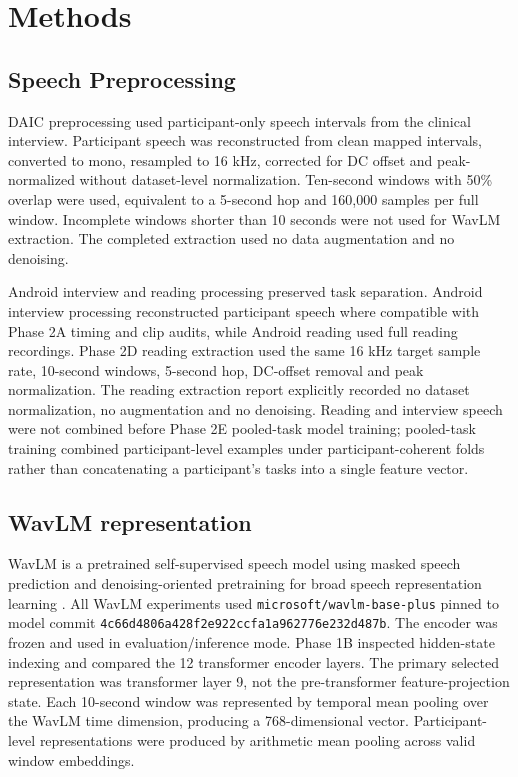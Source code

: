 \documentclass[lettersize,journal]{IEEEtran}
\begin{document}
\section{Methods}

\subsection{Speech Preprocessing}

DAIC preprocessing used participant-only speech intervals from the clinical interview. Participant speech was reconstructed from clean mapped intervals, converted to mono, resampled to 16 kHz, corrected for DC offset and peak-normalized without dataset-level normalization. Ten-second windows with 50\% overlap were used, equivalent to a 5-second hop and 160,000 samples per full window. Incomplete windows shorter than 10 seconds were not used for WavLM extraction. The completed extraction used no data augmentation and no denoising.

Android interview and reading processing preserved task separation. Android interview processing reconstructed participant speech where compatible with Phase 2A timing and clip audits, while Android reading used full reading recordings. Phase 2D reading extraction used the same 16 kHz target sample rate, 10-second windows, 5-second hop, DC-offset removal and peak normalization. The reading extraction report explicitly recorded no dataset normalization, no augmentation and no denoising. Reading and interview speech were not combined before Phase 2E pooled-task model training; pooled-task training combined participant-level examples under participant-coherent folds rather than concatenating a participant's tasks into a single feature vector.

\subsection{WavLM representation}

WavLM is a pretrained self-supervised speech model using masked speech prediction and denoising-oriented pretraining for broad speech representation learning \cite{chen2022wavlm}. All WavLM experiments used \texttt{microsoft/wavlm-base-plus} pinned to model commit \texttt{4c66d4806a428f2e922ccfa1a962776e232d487b}. The encoder was frozen and used in evaluation/inference mode. Phase 1B inspected hidden-state indexing and compared the 12 transformer encoder layers. The primary selected representation was transformer layer 9, not the pre-transformer feature-projection state. Each 10-second window was represented by temporal mean pooling over the WavLM time dimension, producing a 768-dimensional vector. Participant-level representations were produced by arithmetic mean pooling across valid window embeddings.
\end{document}
